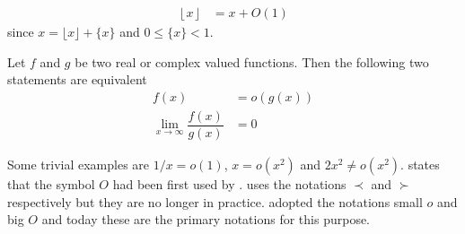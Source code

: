 \documentclass[elemannt.tex]{subfile}
\begin{document}
		\begin{align*}
			\left\lfloor{x}\right\rfloor
				& = x+O(1)
		\end{align*}
	since $x=\lfloor{x}\rfloor+\{x\}$ and $0\leq \{x\}<1$.
		\begin{definition}[Small O]
			Let $f$ and $g$ be two real or complex valued functions. Then the following two statements are equivalent
				\begin{align}
					f(x)
						& = o(g(x))\\
					\lim\limits_{x\to\infty}\dfrac{f(x)}{g(x)}
						& = 0
				\end{align}
		\end{definition}
	Some trivial examples are $1/x=o(1)$, $x=o(x^{2})$ and $2x^{2}\neq o(x^{2})$.  \textcite[Page 883 (second volume is paged consecutively after first volume)]{landau_1909} states that the symbol $O$ had been first used by \textcite[Page 401]{bachmann_1894}. \textcite{hardy_1910} uses the notations $\prec$ and $\succ$ respectively but they are no longer in practice. \textcite{hardy_riesz_1915} adopted the notations small $o$ and big $O$ and today these are the primary notations for this purpose.
\end{document}
